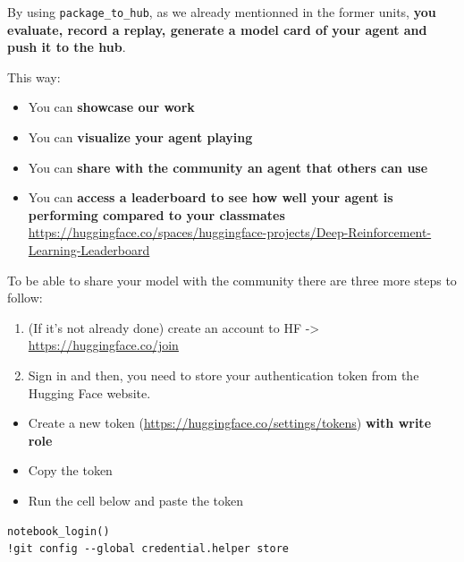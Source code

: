 \documentclass[11pt,a4paper]{article}
\begin{document}
By using \texttt{package\_to\_hub}, as we already mentionned in the former units, \textbf{you evaluate, record a replay, generate a model card of your agent and push it to the hub}.

This way:

\begin{itemize}
\tightlist
\item
  You can \textbf{showcase our work}
\item
  You can \textbf{visualize your agent playing}
\item
  You can \textbf{share with the community an agent that others can use}
\item
  You can \textbf{access a leaderboard to see how well your agent is performing compared to your classmates} \url{https://huggingface.co/spaces/huggingface-projects/Deep-Reinforcement-Learning-Leaderboard}
\end{itemize}

To be able to share your model with the community there are three more steps to follow:

\begin{enumerate}
\def\labelenumi{\arabic{enumi}.}
\item
  (If it's not already done) create an account to HF -\textgreater{} \url{https://huggingface.co/join}
\item
  Sign in and then, you need to store your authentication token from the Hugging Face website.
\end{enumerate}

\begin{itemize}
\tightlist
\item
  Create a new token (\url{https://huggingface.co/settings/tokens}) \textbf{with write role}
\end{itemize}


\begin{itemize}
\tightlist
\item
  Copy the token
\item
  Run the cell below and paste the token
\end{itemize}

\begin{lstlisting}
notebook_login()
!git config --global credential.helper store
\end{lstlisting}
\end{document}
